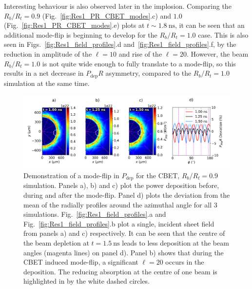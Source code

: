 Interesting behaviour is also observed later in the implosion.
Comparing the $R_b/R_t=0.9$ (Fig.~\ref{fig:Res1_PR_CBET_modes}.c) and $1.0$ (Fig.~\ref{fig:Res1_PR_CBET_modes}.e) plots at $t\sim1.8\ \text{ns}$, it can be seen that an additional mode-flip is beginning to develop for the $R_b/R_t=1.0$ case.
This is also seen in Figs.~\ref{fig:Res1_field_profiles}.d and~\ref{fig:Res1_field_profiles}.f, by the reduction in amplitude of the $\ell=10$ and rise of the $\ell=20$.
However, the beam $R_b/R_t=1.0$ is not quite wide enough to fully translate to a mode-flip, so this results in a net decrease in $P_{\text{dep}}R$ asymmetry, compared to the $R_b/R_t=1.0$ simulation at the same time.

\begin{figure}[t!]
    \includegraphics[width=\linewidth]{Results1/Images/CBET_modeflip.png}
    \centering
    \caption{Demonstration of a mode-flip in $P_{\text{dep}}$ for the \ac{CBET}, $R_b/R_t=0.9$ simulation.
    Panels a), b) and c) plot the power deposition before, during and after the mode-flip.
    Panel d) plots the deviation from the mean of the radially profiles around the azimuthal angle for all 3 simulations.
    Fig.~\ref{fig:Res1_field_profiles}.a and Fig.~\ref{fig:Res1_field_profiles}.b plot a single, incident sheet field from panels a) and c) respectively.
    It can be seen that the centre of the beam depletion at $t=1.5\ \text{ns}$ leads to less deposition at the beam angles (magenta lines) on panel d).
    Panel b) shows that during the \ac{CBET} induced mode-flip, a significant $\ell=20$ occurs in the deposition.
    The reducing absorption at the centre of one beam is highlighted in by the white dashed circles.}%
    \label{fig:Res1_CBET_Deposition_change}
\end{figure}


